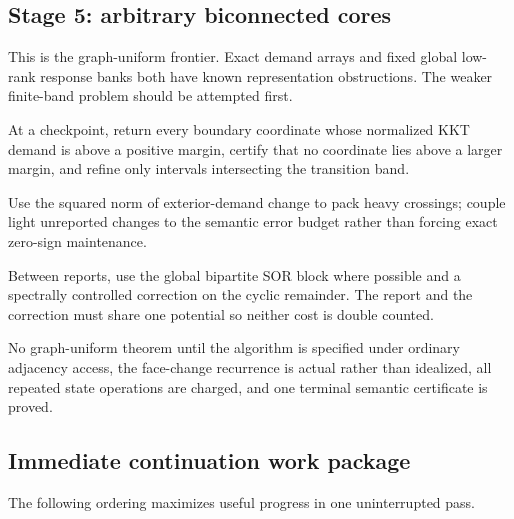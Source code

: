 \subsection{Stage 5: arbitrary biconnected cores}

This is the graph-uniform frontier.  Exact demand arrays and fixed global
low-rank response banks both have known representation obstructions.  The
weaker finite-band problem should be attempted first.

\begin{description}[leftmargin=2.7cm,style=nextline]
\item[Reporter contract]
At a checkpoint, return every boundary coordinate whose normalized KKT demand
is above a positive margin, certify that no coordinate lies above a larger
margin, and refine only intervals intersecting the transition band.
\item[Energy route]
Use the squared norm of exterior-demand change to pack heavy crossings;
couple light unreported changes to the semantic error budget rather than
forcing exact zero-sign maintenance.
\item[Iterative route]
Between reports, use the global bipartite SOR block where possible and a
spectrally controlled correction on the cyclic remainder.  The report and
the correction must share one potential so neither cost is double counted.
\item[Promotion gate]
No graph-uniform theorem until the algorithm is specified under ordinary
adjacency access, the face-change recurrence is actual rather than idealized,
all repeated state operations are charged, and one terminal semantic
certificate is proved.
\end{description}

\subsection{Immediate continuation work package}

The following ordering maximizes useful progress in one uninterrupted pass.

